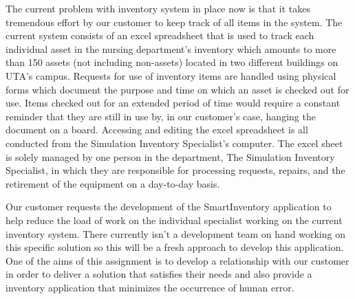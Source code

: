 
The current problem with inventory system in place now is that it takes tremendous effort by our customer to keep track of all items in the system. The current system consists of an excel spreadsheet that is used to track each individual asset in the nursing department's inventory which amounts to more than 150 assets (not including non-assets) located in two different buildings on UTA's campus. Requests for use of inventory items are handled using physical forms which document the purpose and time on which an asset is checked out for use. Items checked out for an extended period of time would require a constant reminder that they are still in use by, in our customer's case, hanging the document on a board. Accessing and editing the excel spreadsheet is all conducted from the Simulation Inventory Specialist's computer. The excel sheet is solely managed by one person in the department, The Simulation Inventory Specialist, in which they are responsible for processing requests, repairs, and the retirement of the equipment on a day-to-day basis. 

Our customer requests the development of the SmartInventory application to help reduce the load of work on the individual specialist working on the current inventory system. There currently isn't a development team on hand working on this specific solution so this will be a fresh approach to develop this application. One of the aims of this assignment is to develop a relationship with our customer in order to deliver a solution that satisfies their needs and also provide a inventory application that minimizes the occurrence of human error. 
